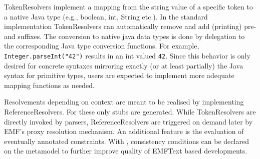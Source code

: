 TokenResolvers implement a mapping from the string value of a specific token to a native 
Java type (e.g., boolean, int, String etc.). In the standard implementation
TokenResolvers can automatically remove and add (printing) pre- and suffixes. The conversion to native 
java data types is done by delegation to the corresponding Java type conversion
functions. For example, \texttt{Integer.parseInt("42")} results in an int valued
\texttt{42}. Since this behavior is only desired for concrete syntaxes
mirroring exactly (or at least partially) the Java syntax for primitive types, users are 
expected to implement more adequate mapping functions as needed.  

Resolvements depending on context are meant to be realised by implementing
ReferenceResolvers. For these only stubs are generated. While TokenResolvers are directly invoked by parsers, 
ReferenceResolvers are triggered on demand later by EMF's proxy resolution mechanism. An 
additional feature is the evaluation of eventually annotated \OCL constraints.
With \OCL, consistency conditions can be declared on the metamodel to further
improve quality of EMFText based developments.
